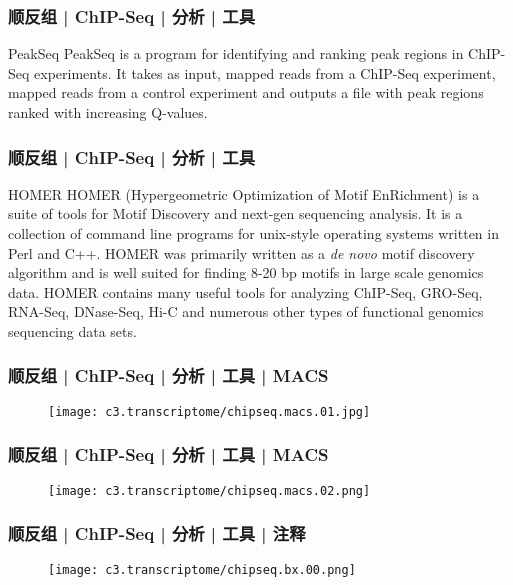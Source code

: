 \begin{frame}
  \frametitle{顺反组 | ChIP-Seq | 分析 | 工具}
  \begin{block}{PeakSeq}
    PeakSeq is a program for identifying and ranking peak regions in ChIP-Seq experiments. It takes as input, mapped reads from a ChIP-Seq experiment, mapped reads from a control experiment and outputs a file with peak regions ranked with increasing Q-values. 
  \end{block}
\end{frame}

\begin{frame}
  \frametitle{顺反组 | ChIP-Seq | 分析 | 工具}
  \begin{block}{HOMER}
    HOMER (Hypergeometric Optimization of Motif EnRichment) is a suite of tools for Motif Discovery and next-gen sequencing analysis.  It is a collection of command line programs for unix-style operating systems written in Perl and C++. HOMER was primarily written as a \textit{de novo} motif discovery algorithm and is well suited for finding 8-20 bp motifs in large scale genomics data.  HOMER contains many useful tools for analyzing ChIP-Seq, GRO-Seq, RNA-Seq, DNase-Seq, Hi-C and numerous other types of functional genomics sequencing data sets.
  \end{block}
\end{frame}

\begin{frame}
  \frametitle{顺反组 | ChIP-Seq | 分析 | 工具 | MACS}
  \begin{figure}
    \centering
    \texttt{[image: c3.transcriptome/chipseq.macs.01.jpg]}
  \end{figure}
\end{frame}

\begin{frame}
  \frametitle{顺反组 | ChIP-Seq | 分析 | 工具 | MACS}
  \begin{figure}
    \centering
    \texttt{[image: c3.transcriptome/chipseq.macs.02.png]}
  \end{figure}
\end{frame}

\begin{frame}
  \frametitle{顺反组 | ChIP-Seq | 分析 | 工具 | 注释}
  \begin{figure}
    \centering
    \texttt{[image: c3.transcriptome/chipseq.bx.00.png]}
  \end{figure}
\end{frame}

